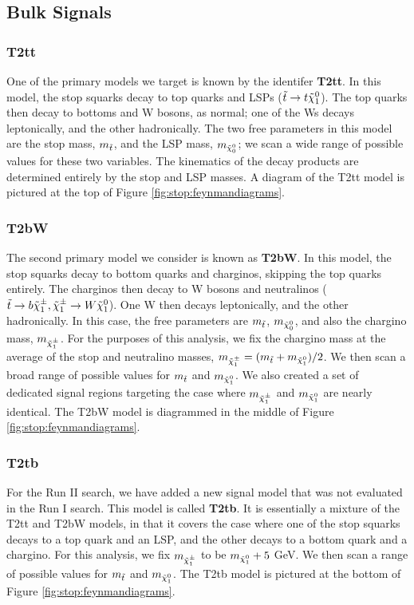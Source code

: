 \subsection{Bulk Signals}
\label{ssec:stop:sigbulk}

\subsubsection*{T2tt}

One of the primary models we target is known by the identifer
\textbf{T2tt}. In this model, the stop squarks decay to top quarks and
LSPs ($\tilde{t} \rightarrow t \tilde{\chi}^0_1$). The top quarks then decay to
bottoms and W bosons, as normal; one of the Ws decays leptonically,
and the other hadronically. The two free parameters in this model are
the stop mass, $m_{\tilde{t}}$, and the LSP mass, $m_{\tilde{\chi}^0_0}$; we
scan a wide range of possible values for these two variables. The
kinematics of the decay products are determined entirely by the stop
and LSP masses. A diagram of the T2tt model is pictured at the top of
Figure \ref{fig:stop:feynmandiagrams}.

\subsubsection*{T2bW}

The second primary model we consider is known as \textbf{T2bW}. In this
model, the stop squarks decay to bottom quarks and charginos, skipping
the top quarks entirely. The charginos then decay to W bosons and
neutralinos ($\tilde{t} \rightarrow b \tilde{\chi}^\pm_1, \tilde{\chi}^\pm_1 \rightarrow
W \tilde{\chi}^0_1$). One W then decays leptonically, and the other
hadronically. In this case, the free parameters are $m_{\tilde{t}}$,
$m_{\tilde{\chi}^0_0}$, and also the chargino mass, $m_{\tilde{\chi}^\pm_1}$. For the
purposes of this analysis, we fix the chargino mass at the average of
the stop and neutralino masses, $m_{\tilde{\chi}^\pm_1} = (m_{\tilde{t}}
+ m_{\tilde{\chi}^0_1}) / 2$. We then scan a broad range of possible values
for $m_{\tilde{t}}$ and $m_{\tilde{\chi}^0_1}$. We also created a set of
dedicated signal regions targeting the case where $m_{\tilde{\chi}^\pm_1}$ and
$m_{\tilde{\chi}^0_1}$ are nearly identical. The T2bW model is diagrammed in
the middle of Figure \ref{fig:stop:feynmandiagrams}.

\subsubsection*{T2tb}

For the Run II search, we have added a new signal model that was not
evaluated in the Run I search. This model is called \textbf{T2tb}. It
is essentially a mixture of the T2tt and T2bW models, in that it
covers the case where one of the stop squarks decays to a top quark
and an LSP, and the other decays to a bottom quark and a chargino. For
this analysis, we fix $m_{\tilde{\chi}^\pm_1}$ to be $m_{\tilde{\chi}^0_1} + 5$ GeV. We
then scan a range of possible values for $m_{\tilde{t}}$ and
$m_{\tilde{\chi}^0_1}$. The T2tb model is pictured at the bottom of Figure
\ref{fig:stop:feynmandiagrams}.

